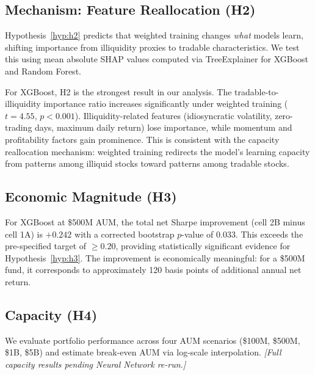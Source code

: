 \documentclass[a4paper,12pt,final]{article}
\begin{document}
\subsection{Mechanism: Feature Reallocation (H2)}
\label{subsec:h2_results}

Hypothesis~\ref{hyp:h2} predicts that weighted training changes \emph{what} models learn, shifting importance from illiquidity proxies to tradable characteristics. We test this using mean absolute SHAP values computed via TreeExplainer for XGBoost and Random Forest.

% 


For XGBoost, H2 is the strongest result in our analysis. The tradable-to-illiquidity importance ratio increases significantly under weighted training ($t=4.55$, $p<0.001$). Illiquidity-related features (idiosyncratic volatility, zero-trading days, maximum daily return) lose importance, while momentum and profitability factors gain prominence. This is consistent with the capacity reallocation mechanism: weighted training redirects the model's learning capacity from patterns among illiquid stocks toward patterns among tradable stocks.

\subsection{Economic Magnitude (H3)}
\label{subsec:h3_results}

% 

For XGBoost at \$500M AUM, the total net Sharpe improvement (cell 2B minus cell 1A) is $+0.242$ with a corrected bootstrap $p$-value of 0.033. This exceeds the pre-specified target of $\geq 0.20$, providing statistically significant evidence for Hypothesis~\ref{hyp:h3}. The improvement is economically meaningful: for a \$500M fund, it corresponds to approximately 120 basis points of additional annual net return.

\subsection{Capacity (H4)}
\label{subsec:h4_results}


We evaluate portfolio performance across four AUM scenarios (\$100M, \$500M, \$1B, \$5B) and estimate break-even AUM via log-scale interpolation. \emph{[Full capacity results pending Neural Network re-run.]}
\end{document}

